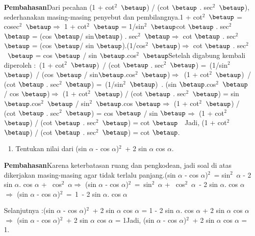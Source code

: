 \documentclass[11pt,fleqn]{book} %
\begin{document}
\begin{myEnumerate}
\begin{itemize}
\noindent \textbf{Pembahasan}Dari pecahan (1 + cot${}^{2}$~$\betaup$) / (cot $\betaup$ . sec${}^{2}$~$\betaup$), sederhanakan masing-masing penyebut dan pembilangnya.1 + cot${}^{2}$~$\betaup$ = cosec${}^{2}$~$\betaup$$\mathrm{\Rightarrow }$ 1 + cot${}^{2}$~$\betaup$ = 1/sin${}^{2}$~$\betaup$cot $\betaup$ . sec${}^{2}$~$\betaup$ = (cos $\betaup$/ sin$\betaup$) . sec${}^{2}$~$\betaup$$\mathrm{\Rightarrow }$ cot $\betaup$ . sec${}^{2}$~$\betaup$ = (cos $\betaup$/ sin $\betaup$).(1/cos${}^{2}$~$\betaup$)$\mathrm{\Rightarrow }$ cot $\betaup$ . sec${}^{2}$~$\betaup$ = cos $\betaup$ / sin $\betaup$.cos${}^{2}$~$\betaup$Setelah digabung kembali diperoleh :~(1 + cot${}^{2}$~$\betaup$)~/ (cot $\betaup$ . sec${}^{2}$~$\betaup$) =~(1/sin${}^{2}$~$\betaup$)~/ (cos $\betaup$ / sin$\betaup$.cos${}^{2}$~$\betaup$)$\mathrm{\Rightarrow }$~(1 + cot${}^{2}$~$\betaup$)~/ (cot $\betaup$ . sec${}^{2}$~$\betaup$) =~(1/sin${}^{2}$~$\betaup$)~. (sin $\betaup$.cos${}^{2}$~$\betaup$ / cos $\betaup$)$\mathrm{\Rightarrow }$ (1 + cot${}^{2}$~$\betaup$) / (cot $\betaup$ . sec${}^{2}$~$\betaup$) = sin $\betaup$.cos${}^{2}$~$\betaup$ / sin${}^{2}$~$\betaup$.cos $\betaup$$\mathrm{\Rightarrow }$ (1 + cot${}^{2}$~$\betaup$) / (cot $\betaup$ . sec${}^{2}$~$\betaup$) = cos $\betaup$ / sin $\betaup$$\mathrm{\Rightarrow }$ (1 + cot${}^{2}$~$\betaup$) / (cot $\betaup$ . sec${}^{2}$~$\betaup$) = cot $\betaup$~~Jadi, (1 + cot${}^{2}$~$\betaup$) / (cot $\betaup$ . sec${}^{2}$~$\betaup$) = cot $\betaup$.

\begin{enumerate}
\item  Tentukan nilai dari (sin $\alpha$ - cos $\alpha$)${}^{2}$~+ 2 sin $\alpha$ cos $\alpha$.
\end{enumerate}

\noindent \textbf{Pembahasan}Karena keterbatasan ruang dan pengkodean, jadi soal di atas dikerjakan masing-masing agar tidak terlalu panjang.(sin $\alpha$ - cos $\alpha$)${}^{2}$~= sin${}^{2}$~$\alpha$ - 2 sin $\alpha$. cos $\alpha$ +~ cos${}^{2}$~$\alpha$$\mathrm{\Rightarrow }$ (sin $\alpha$ - cos $\alpha$)${}^{2}$~=~sin${}^{2}$~$\alpha$ +~ cos${}^{2}$~$\alpha$~- 2 sin $\alpha$. cos $\alpha$$\mathrm{\Rightarrow }$ (sin $\alpha$ - cos $\alpha$)${}^{2}$~=~1~- 2 sin $\alpha$. cos $\alpha$

\noindent Selanjutnya :(sin $\alpha$ - cos $\alpha$)${}^{2}$~+ 2 sin $\alpha$ cos $\alpha$ = 1 - 2 sin $\alpha$. cos $\alpha$ + 2 sin $\alpha$ cos $\alpha$$\mathrm{\Rightarrow }$ (sin $\alpha$ - cos $\alpha$)${}^{2}$~+ 2 sin $\alpha$ cos $\alpha$ = 1Jadi, (sin $\alpha$ - cos $\alpha$)${}^{2}$~+ 2 sin $\alpha$ cos $\alpha$ = 1.


\end{itemize}
\end{myEnumerate}
\end{document}
